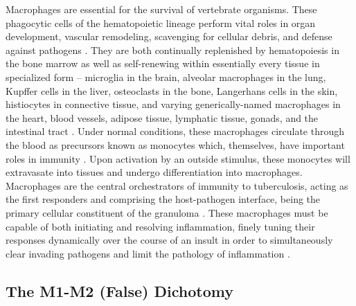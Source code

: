 Macrophages are essential for the survival of vertebrate organisms. These phagocytic cells of the hematopoietic lineage perform vital roles in organ development, vascular remodeling, scavenging for cellular debris, and defense against pathogens \citep{Wynn2013}. They are both continually replenished by hematopoiesis in the bone marrow as well as self\hyp{}renewing within essentially every tissue in specialized form -- microglia in the brain, alveolar macrophages in the lung, Kupffer cells in the liver, osteoclasts in the bone, Langerhans cells in the skin, histiocytes in connective tissue, and varying generically\hyp{}named macrophages in the heart, blood vessels, adipose tissue, lymphatic tissue, gonads, and the intestinal tract \citep{Davies2013a, Na2019, Bain2018}. Under normal conditions, these macrophages circulate through the blood as precursors known as monocytes which, themselves, have important roles in immunity \citep{Sampath2018, Mass2018}. Upon activation by an outside stimulus, these monocytes will extravasate into tissues and undergo differentiation into macrophages. Macrophages are the central orchestrators of immunity to tuberculosis, acting as the first responders and comprising the host\hyp{}pathogen interface, being the primary cellular constituent of the granuloma \citep{Pagan2018}. These macrophages must be capable of both initiating and resolving inflammation, finely tuning their responses dynamically over the course of an insult in order to simultaneously clear invading pathogens and limit the pathology of inflammation \citep{Watanabe2019, Murray2011, Unanue1987}.

\subsection{The M1\hyp{}M2 (False) Dichotomy}\label{lies}

